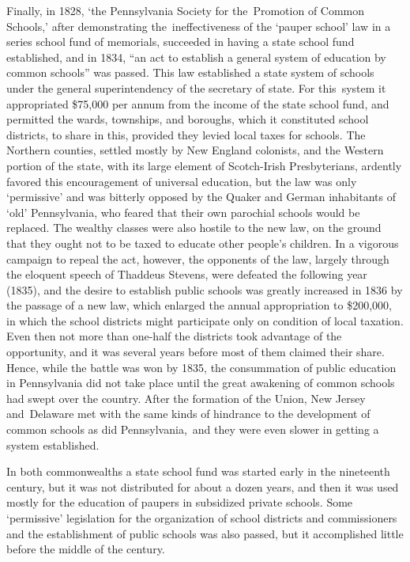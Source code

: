 \documentclass[]{book}
\begin{document}
Finally, in 1828, `the Pennsylvania Society for the~Promotion of Common Schools,' after demonstrating the~ineffectiveness of the `pauper school' law in a series school fund of memorials, succeeded in having a state school fund established, and in 1834, ``an act to establish a general system of education by common schools'' was passed. This law established a state system of schools under the general superintendency of the secretary of state. For this~system it appropriated \$75,000 per annum from the income of the state school fund, and permitted the wards, townships, and boroughs, which it constituted school districts, to share in this, provided they levied local taxes for schools. The Northern counties, settled mostly by New England colonists, and the Western portion of the state, with its large element of Scotch-Irish Presbyterians, ardently favored this encouragement of universal education, but the law was only `permissive' and was bitterly opposed by the Quaker and German inhabitants of `old' Pennsylvania, who feared that their own parochial schools would be replaced. The wealthy classes were also hostile to the new law, on the ground that they ought not to be taxed to educate other people's children. In a vigorous campaign to repeal the act, however, the opponents of the law, largely through the eloquent speech of Thaddeus Stevens, were defeated the following year (1835), and the desire to establish public schools was greatly increased in 1836 by the passage of a new law, which enlarged the annual appropriation to \$200,000, in which the school districts might participate only on condition of local taxation. Even then not more than one-half the districts took advantage of the opportunity, and it was several years before most of them claimed their share. Hence, while the battle was won by 1835, the consummation of public education in Pennsylvania did not take place until the great awakening of common schools had swept over the country. After the formation of the Union, New Jersey and~Delaware met with the same kinds of hindrance to the development of common schools as did Pennsylvania,~and they were even slower in getting a system established.

In both commonwealths a state school fund was started early in the nineteenth century, but it was not distributed for about a dozen years, and then it was used mostly for the education of paupers in subsidized private schools. Some `permissive' legislation for the organization of school districts and commissioners and the establishment of public schools was also passed, but it accomplished little before the middle of the century.
\end{document}
